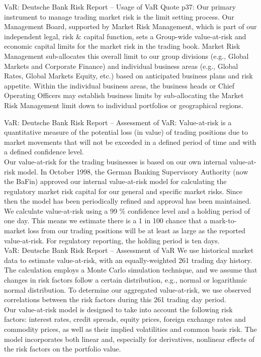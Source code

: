 VaR: Deutsche Bank Risk Report -- Usage of VaR
Quote p37: Our primary instrument to manage trading market risk is the limit setting process. Our Management Board,
supported by Market Risk Management, which is part of our independent legal, risk \& capital function, sets a
Group-wide value-at-risk and economic capital limits for the market risk in the trading book. Market Risk Management
sub-allocates this overall limit to our group divisions (e.g., Global Markets and Corporate Finance)
and individual business areas (e.g., Global Rates, Global Markets Equity, etc.) based on anticipated business
plans and risk appetite. Within the individual business areas, the business heads or Chief Operating Officers
may establish business limits by sub-allocating the Market Risk Management limit down to individual portfolios
or geographical regions.


VaR: Deutsche Bank Risk Report -- Assessment of VaR:
Value-at-risk is a quantitative measure of the potential loss (in value) of trading positions due to market
movements that will not be exceeded in a defined period of time and with a defined confidence level.\\
Our value-at-risk for the trading businesses is based on our own internal value-at-risk model. In October 1998,
the German Banking Supervisory Authority (now the BaFin) approved our internal value-at-risk model for
calculating the regulatory market risk capital for our general and specific market risks. Since then the model
has been periodically refined and approval has been maintained.\\
We calculate value-at-risk using a 99 \% confidence level and a holding period of one day. This means we
estimate there is a 1 in 100 chance that a mark-to-market loss from our trading positions will be at least as
large as the reported value-at-risk. For regulatory reporting, the holding period is ten days.\\


VaR: Deutsche Bank Risk Report -- Assessment of VaR
We use historical market data to estimate value-at-risk, with an equally-weighted 261 trading day history. The
calculation employs a Monte Carlo simulation technique, and we assume that changes in risk factors follow a
certain distribution, e.g., normal or logarithmic normal distribution. To determine our aggregated value-at-risk,
we use observed correlations between the risk factors during this 261 trading day period.\\
Our value-at-risk model is designed to take into account the following risk factors: interest rates, credit
spreads, equity prices, foreign exchange rates and commodity prices, as well as their implied volatilities and
common basis risk. The model incorporates both linear and, especially for derivatives, nonlinear effects of the
risk factors on the portfolio value.



